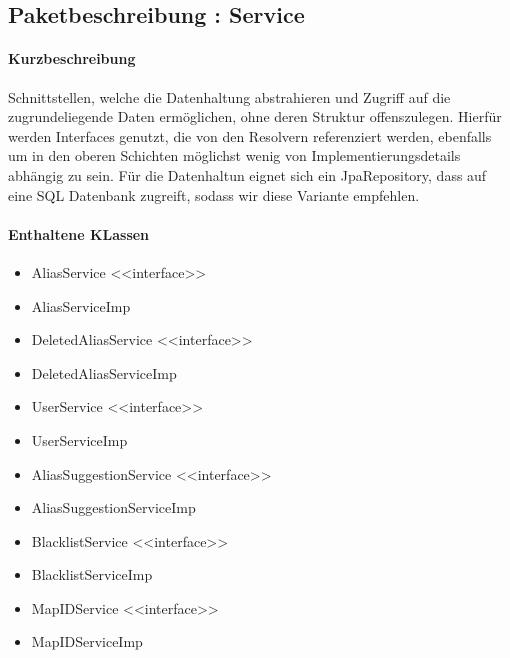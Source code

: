 \subsection{Paketbeschreibung : Service}%
\paragraph*{Kurzbeschreibung}
Schnittstellen, welche die Datenhaltung abstrahieren und Zugriff auf die zugrundeliegende Daten ermöglichen, ohne deren Struktur offenszulegen.
Hierfür werden Interfaces genutzt, die von den Resolvern referenziert werden, ebenfalls um in den oberen Schichten möglichst 
wenig von Implementierungsdetails abhängig zu sein. Für die Datenhaltun eignet sich ein JpaRepository, dass auf 
eine SQL Datenbank zugreift, sodass wir diese Variante empfehlen.
\paragraph*{Enthaltene KLassen}
\begin{itemize}
    \item AliasService <<interface>>
    \item AliasServiceImp
    \item DeletedAliasService <<interface>>
    \item DeletedAliasServiceImp
    \item UserService <<interface>>
    \item UserServiceImp
    \item AliasSuggestionService <<interface>>
    \item AliasSuggestionServiceImp
    \item BlacklistService <<interface>>
    \item BlacklistServiceImp
    \item MapIDService <<interface>>
    \item MapIDServiceImp
\end{itemize}

